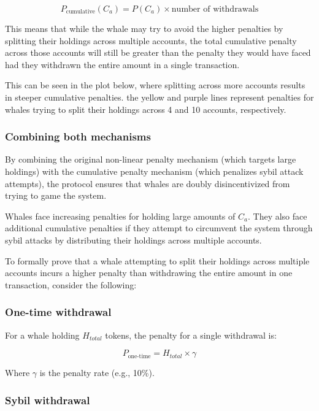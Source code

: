 \documentclass{article}
\begin{document}
\[
P_{\text{cumulative}}(C_a) = P(C_a) \times \text{number of withdrawals}
\]

This means that while the whale may try to avoid the higher penalties by splitting their holdings across multiple accounts, the total cumulative penalty across those accounts will still be greater than the penalty they would have faced had they withdrawn the entire amount in a single transaction.

This can be seen in the plot below, where splitting across more accounts results in steeper cumulative penalties. the yellow and purple lines represent penalties for whales trying to split their holdings across 4 and 10 accounts, respectively.








\subsubsection{Combining both mechanisms}

By combining the original non-linear penalty mechanism (which targets large holdings) with the cumulative penalty mechanism (which penalizes sybil attack attempts), the protocol ensures that whales are doubly disincentivized from trying to game the system. 

Whales face increasing penalties for holding large amounts of $C_a$. They also face additional cumulative penalties if they attempt to circumvent the system through sybil attacks by distributing their holdings across multiple accounts.

To formally prove that a whale attempting to split their holdings across multiple accounts incurs a higher penalty than withdrawing the entire amount in one transaction, consider the following:

\subsubsection{One-time withdrawal}

For a whale holding $H_{total}$ tokens, the penalty for a single withdrawal is:

\[
P_{\text{one-time}} = H_{total} \times \gamma
\]

Where $\gamma$ is the penalty rate (e.g., 10\%).

\subsubsection{Sybil withdrawal}
\end{document}
